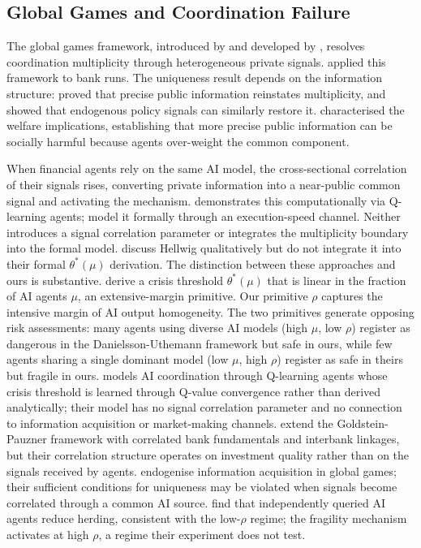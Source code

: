 \label{sec:literature}

\subsection{Global Games and Coordination Failure}

The global games framework, introduced by \citet{carlsson1993} and developed by \citet{morris1998, morris2002}, resolves coordination multiplicity through heterogeneous private signals. \citet{goldstein2005} applied this framework to bank runs. The uniqueness result depends on the information structure: \citet{hellwig2002} proved that precise public information reinstates multiplicity, and \citet{angeletos2006} showed that endogenous policy signals can similarly restore it. \citet{angeletos2007} characterised the welfare implications, establishing that more precise public information can be socially harmful because agents over-weight the common component.

When financial agents rely on the same AI model, the cross-sectional correlation of their signals rises, converting private information into a near-public common signal and activating the \citet{hellwig2002} mechanism. \citet{yang2024} demonstrates this computationally via Q-learning agents; \citet{danielsson2025} model it formally through an execution-speed channel. Neither introduces a signal correlation parameter or integrates the \citet{hellwig2002} multiplicity boundary into the formal model. \citet{danielsson2025} discuss Hellwig qualitatively but do not integrate it into their formal $\theta^*(\mu)$ derivation. The distinction between these approaches and ours is substantive. \citet{danielsson2025} derive a crisis threshold $\theta^*(\mu)$ that is linear in the fraction of AI agents $\mu$, an extensive-margin primitive. Our primitive $\rho$ captures the intensive margin of AI output homogeneity. The two primitives generate opposing risk assessments: many agents using diverse AI models (high $\mu$, low $\rho$) register as dangerous in the Danielsson-Uthemann framework but safe in ours, while few agents sharing a single dominant model (low $\mu$, high $\rho$) register as safe in theirs but fragile in ours. \citet{yang2024} models AI coordination through Q-learning agents whose crisis threshold is learned through Q-value convergence rather than derived analytically; their model has no signal correlation parameter and no connection to information acquisition or market-making channels. \citet{margaretic2014} extend the Goldstein-Pauzner framework with correlated bank fundamentals and interbank linkages, but their correlation structure operates on investment quality rather than on the signals received by agents. \citet{szkup2015} endogenise information acquisition in global games; their sufficient conditions for uniqueness may be violated when signals become correlated through a common AI source. \citet{hansen2025} find that independently queried AI agents reduce herding, consistent with the low-$\rho$ regime; the fragility mechanism activates at high $\rho$, a regime their experiment does not test.

